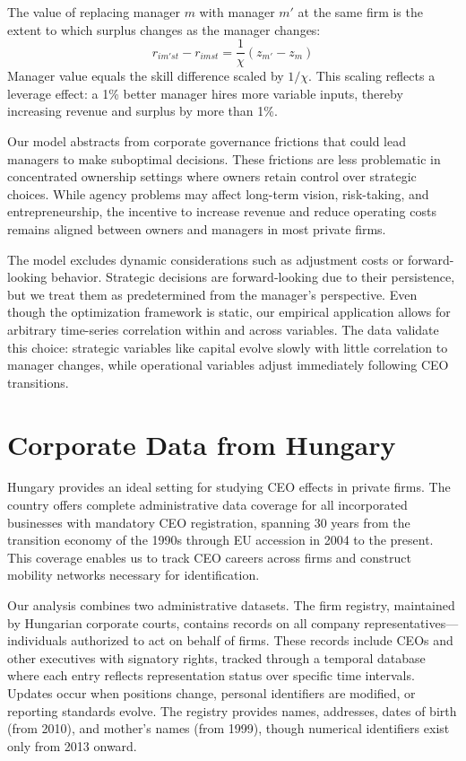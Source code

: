 \documentclass[11pt,a4paper]{article}
\begin{document}
The value of replacing manager $m$ with manager $m'$ at the same firm is the extent to which surplus changes as the manager changes:
\begin{equation}\label{eq:manager_value}
r_{im'st} - r_{imst} = \frac{1}{\chi}(z_{m'} - z_{m})
\end{equation}
Manager value equals the skill difference scaled by $1/\chi$. This scaling reflects a leverage effect: a 1\% better manager hires more variable inputs, thereby increasing revenue and surplus by more than 1\%.

Our model abstracts from corporate governance frictions that could lead managers to make suboptimal decisions. These frictions are less problematic in concentrated ownership settings where owners retain control over strategic choices. While agency problems may affect long-term vision, risk-taking, and entrepreneurship, the incentive to increase revenue and reduce operating costs remains aligned between owners and managers in most private firms.

The model excludes dynamic considerations such as adjustment costs or forward-looking behavior. Strategic decisions are forward-looking due to their persistence, but we treat them as predetermined from the manager's perspective. Even though the optimization framework is static, our empirical application allows for arbitrary time-series correlation within and across variables. The data validate this choice: strategic variables like capital evolve slowly with little correlation to manager changes, while operational variables adjust immediately following CEO transitions.

\section{Corporate Data from Hungary}

Hungary provides an ideal setting for studying CEO effects in private firms. The country offers complete administrative data coverage for all incorporated businesses with mandatory CEO registration, spanning 30 years from the transition economy of the 1990s through EU accession in 2004 to the present. This coverage enables us to track CEO careers across firms and construct mobility networks necessary for identification.

Our analysis combines two administrative datasets. The firm registry, maintained by Hungarian corporate courts, contains records on all company representatives—individuals authorized to act on behalf of firms. These records include CEOs and other executives with signatory rights, tracked through a temporal database where each entry reflects representation status over specific time intervals. Updates occur when positions change, personal identifiers are modified, or reporting standards evolve. The registry provides names, addresses, dates of birth (from 2010), and mother's names (from 1999), though numerical identifiers exist only from 2013 onward.
\end{document}
